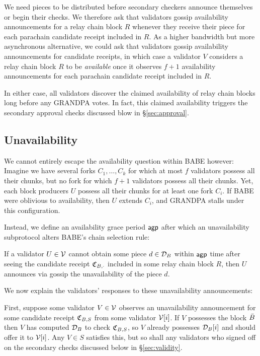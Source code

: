 We need pieces to be distributed before secondary checkers announce themselves or begin their checks.  We therefore ask that validators gossip availability announcements for a relay chain block $R$ whenever they receive their piece for each parachain candidate receipt included in $R$.  As a higher bandwidth but more asynchronous alternative, we could ask that validators gossip availability announcements for candidate receipts, in which case a validator $V$ considers a relay chain block $R$ to be {\em available} once it observes $f+1$ availability announcements for each parachain candidate receipt included in $R$.

In either case, all validators discover the claimed availability of relay chain blocks long before any GRANDPA votes.  In fact, this claimed availability triggers the secondary approval checks discussed blow in \S\ref{sec:approval}.  


\subsection{Unavailability} %
\label{sec:unavailability}

We cannot entirely escape the availability question within BABE however:  Imagine we have several forks $C_1,\ldots,C_k$ for which at most $f$ validators possess all their chunks, but no fork for which $f+1$ validators possess all their chunks.  Yet, each block producers $U$ possess all their chunks for at least one fork $C_i$.  If BABE were oblivious to availability, then $U$ extends $C_i$, and GRANDPA stalls under this configuration. 

Instead, we define an availability grace period $\mathsf{agp}$ after which an unavailability subprotocol alters BABE's chain selection rule:  

If a validator $U \in \mathcal{V}$ cannot obtain some piece $d \in \mathcal{D}_B$ within $\mathsf{agp}$ time after seeing the candidate receipt $\mathfrak{C}_{B,\cdot}$ included in some relay chain block $R$, then $U$ announces via gossip the unavailability of the piece $d$. 

We now explain the validators' responses to these unavailability announcements:

First, suppose some validator $V \in \mathcal{V}$ observes an unavailability announcement for some candidate receipt $\mathfrak{C}_{B,S}$ from some validator $\mathcal{V}[i]$.  If $V$ possesses the block $\bar{B}$ then $V$ has computed $\mathcal{D}_B$ to check $\mathfrak{C}_{B,S}$, so $V$ already possesses $\mathcal{D}_B[i]$ and should offer it to $\mathcal{V}[i]$.  Any $V \in S$ satisfies this, but so shall any validators who signed off on the secondary checks discussed below in \S\ref{sec:validity}. 

